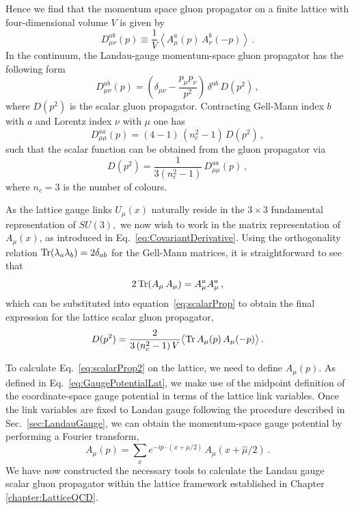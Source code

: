 Hence we find that the momentum space gluon propagator on a finite lattice with four-dimensional volume $V$ is given by
%
\begin{equation}
D_{\mu\nu}^{ab}(p) \equiv \frac{1}{V}\left \langle A^a_\mu (p)\,A^b_\nu(-p)\right\rangle \, . \label{eq:gluonProp}
\end{equation}
%
In the continuum, the Landau-gauge momentum-space gluon propagator has the following form~\cite{Leinweber:1998im,Bonnet:2001uh}
%
\begin{equation}
D^{ab}_{\mu\nu}(p) = \left ( \delta_{\mu\nu} - \frac{p_\mu p_\nu}{p^2} \right )\,\delta^{ab}\,D(p^2) \, ,
\end{equation}
%
where $D(p^2)$ is the scalar gluon propagator.  Contracting Gell-Mann index $b$ with $a$ and
Lorentz index $\nu$ with $\mu$ one has
%
\begin{equation}
D^{aa}_{\mu\mu}(p) = (4-1)\,(n_c^2-1)\,D(p^2) \, ,
\end{equation}
%
such that the scalar function can be obtained from the gluon propagator via
%
\begin{equation}
D(p^2) = \frac{1}{3(n_c^2-1)}\,D^{aa}_{\mu\mu}(p) \, ,
\label{eq:scalarProp}
\end{equation}
%
where $n_c = 3$ is the number of colours.

As the lattice gauge links $U_\mu(x)$ naturally reside in the $3\times 3$ fundamental representation of $SU(3),$ we now wish to work in the matrix representation of $A_\mu(x)$, as introduced in Eq.~\ref{eq:CovariantDerivative}. Using the orthogonality relation $\operatorname{Tr}(\lambda_a\lambda_b) = 2\delta_{ab}$ for the Gell-Mann matrices, it is straightforward to see that
%
\begin{equation}
2\operatorname{Tr}(A_\mu\,A_\mu) = A^a_\mu A^a_\mu\, ,
\end{equation}
%
which can be substituted into equation~\ref{eq:scalarProp} to obtain the final expression for the lattice scalar gluon propagator,
%
\begin{equation}
D(p^2) = \frac{2}{3\,(n_c^2-1)\,V}\big\langle {\rm Tr}\, A_\mu(p)\,A_\mu(-p) \big\rangle \,. \label{eq:scalarProp2}
\end{equation}

To calculate Eq.~\ref{eq:scalarProp2} on the lattice, we need to define $A_\mu(p)$. As defined in Eq.~\ref{eq:GaugePotentialLat}, we make use of the midpoint definition of the coordinate-space gauge potential in terms of the lattice link variables. Once the link variables are fixed to Landau gauge following the procedure described in Sec.~\ref{sec:LandauGauge}, we can obtain the momentum-space gauge potential by performing a Fourier transform,
%
\begin{equation}
A_\mu(p) = \sum_x e^{-ip\cdot(x+\hat{\mu}/2)}\, A_\mu(x+\hat{\mu}/2)\, .
\end{equation}
%
We have now constructed the necessary tools to calculate the Landau gauge scalar gluon propagator within the lattice framework established in Chapter \ref{chapter:LatticeQCD}.

